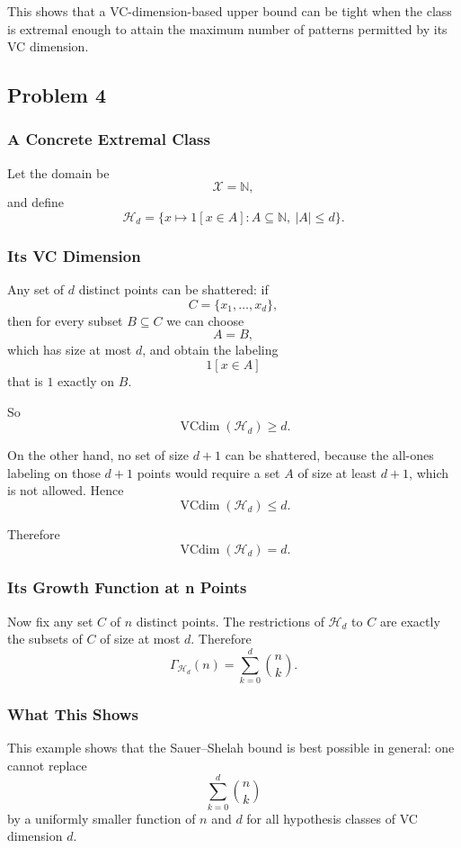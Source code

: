 \documentclass{article}
\begin{document}
This shows that a VC-dimension-based upper bound can be tight when the class is extremal enough to attain the maximum number of patterns permitted by its VC dimension.

\subsection{Problem 4}

\subsubsection{A Concrete Extremal Class}

Let the domain be
$$
\mathcal{X} = \mathbb{N},
$$
and define
$$
\mathcal{H}_d
=
\{x \mapsto 1[x \in A] : A \subseteq \mathbb{N},\ |A| \le d\}.
$$

\subsubsection{Its VC Dimension}

Any set of $d$ distinct points can be shattered: if
$$
C = \{x_1,\dots,x_d\},
$$
then for every subset $B \subseteq C$ we can choose
$$
A = B,
$$
which has size at most $d$, and obtain the labeling
$$
1[x \in A]
$$
that is $1$ exactly on $B$.

So
$$
\operatorname{VCdim}(\mathcal{H}_d) \ge d.
$$

On the other hand, no set of size $d+1$ can be shattered, because the all-ones labeling on those $d+1$ points would require a set $A$ of size at least $d+1$, which is not allowed. Hence
$$
\operatorname{VCdim}(\mathcal{H}_d) \le d.
$$

Therefore
$$
\operatorname{VCdim}(\mathcal{H}_d) = d.
$$

\subsubsection{Its Growth Function at n Points}

Now fix any set $C$ of $n$ distinct points. The restrictions of $\mathcal{H}_d$ to $C$ are exactly the subsets of $C$ of size at most $d$. Therefore
$$
\Gamma_{\mathcal{H}_d}(n)
=
\sum_{k=0}^d \binom{n}{k}.
$$

\subsubsection{What This Shows}

This example shows that the Sauer--Shelah bound is best possible in general: one cannot replace
$$
\sum_{k=0}^d \binom{n}{k}
$$
by a uniformly smaller function of $n$ and $d$ for all hypothesis classes of VC dimension $d$.
\end{document}
